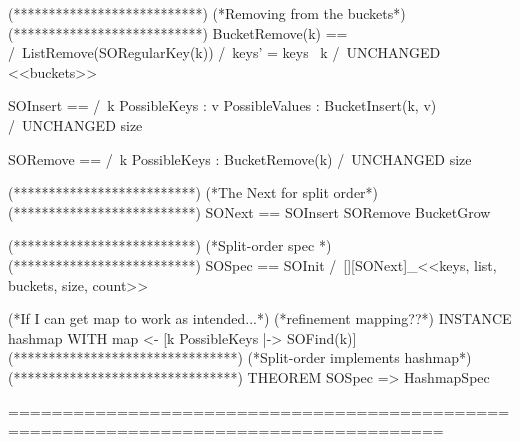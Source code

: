 \documentclass{uit-thesis}
\begin{document}
\begin{tla}
                     (***************************)
                     (*Removing from the buckets*)
                     (***************************)                
                     BucketRemove(k) == /\ ListRemove(SORegularKey(k))
                     /\ keys' = keys \ {k}
                     /\ UNCHANGED <<buckets>>
                     
                     
                     SOInsert == /\  \E k \in PossibleKeys :
                     \E v \in PossibleValues :
                     BucketInsert(k, v)
                     /\ UNCHANGED size
                     
                     SORemove == /\  \E k \in PossibleKeys :
                     BucketRemove(k)
                     /\ UNCHANGED size
                     
                     
                     (**************************)
                     (*The Next for split order*)
                     (**************************)
                     SONext ==   \/ SOInsert
                     \/ SORemove
                     \/ BucketGrow
                     
                     (**************************)
                     (*Split-order spec        *)
                     (**************************)
                     SOSpec == SOInit /\ [][SONext]_<<keys, list, buckets, size, count>>
                     
                     
                     (*If I can get map to work as intended...*)
                     (*refinement mapping??*)
                     INSTANCE  hashmap WITH map <- [k \in PossibleKeys |-> SOFind(k)]
                     (********************************)
                     (*Split-order implements hashmap*)
                     (********************************)
                     THEOREM SOSpec => HashmapSpec
                     
                     ======================================================================================
    \end{tla}
\end{document}
